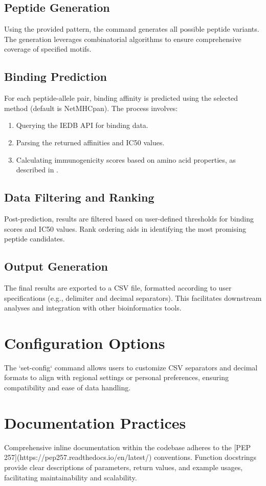 \documentclass{article}
\begin{document}
\subsection{Peptide Generation}
Using the provided pattern, the command generates all possible peptide variants. The generation leverages combinatorial algorithms to ensure comprehensive coverage of specified motifs.

\subsection{Binding Prediction}
For each peptide-allele pair, binding affinity is predicted using the selected method (default is NetMHCpan). The process involves:
\begin{enumerate}
    \item Querying the IEDB API for binding data.
    \item Parsing the returned affinities and IC50 values.
    \item Calculating immunogenicity scores based on amino acid properties, as described in \cite{smith2020immunogenicity}.
\end{enumerate}

\subsection{Data Filtering and Ranking}
Post-prediction, results are filtered based on user-defined thresholds for binding scores and IC50 values. Rank ordering aids in identifying the most promising peptide candidates.

\subsection{Output Generation}
The final results are exported to a CSV file, formatted according to user specifications (e.g., delimiter and decimal separators). This facilitates downstream analyses and integration with other bioinformatics tools.

\section{Configuration Options}
The `set-config` command allows users to customize CSV separators and decimal formats to align with regional settings or personal preferences, ensuring compatibility and ease of data handling.

\section{Documentation Practices}
Comprehensive inline documentation within the codebase adheres to the [PEP 257](https://pep257.readthedocs.io/en/latest/) conventions. Function docstrings provide clear descriptions of parameters, return values, and example usages, facilitating maintainability and scalability.
\end{document}

